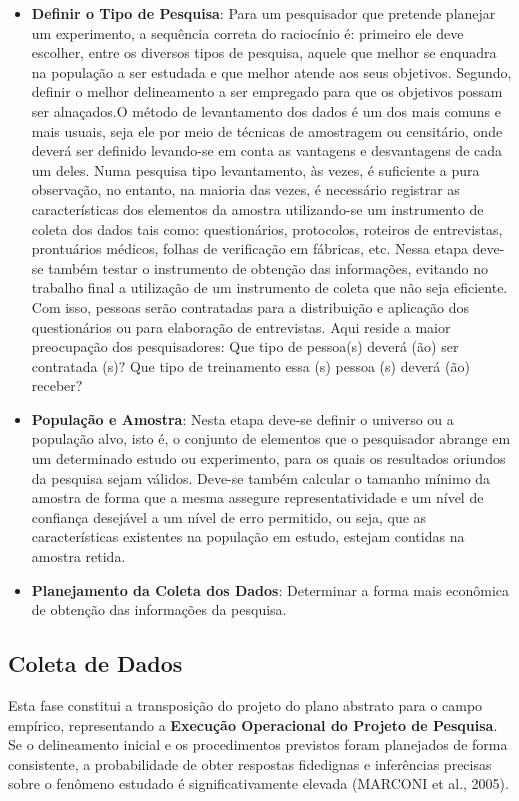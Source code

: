 \begin{itemize}
\newpage
\item \textbf{Definir o Tipo de Pesquisa}: Para um pesquisador que pretende planejar um experimento, a sequência correta do raciocínio é: primeiro ele deve escolher, entre os diversos tipos de pesquisa, aquele que melhor se enquadra na população a ser estudada e que melhor atende aos seus objetivos. Segundo, definir o melhor delineamento a ser empregado para que os objetivos possam ser alnaçados.O método de levantamento dos dados é um dos mais comuns e mais usuais, seja ele por meio de técnicas de amostragem ou censitário, onde deverá ser definido levando-se em conta as vantagens e desvantagens de cada um deles. Numa pesquisa tipo levantamento, às vezes, é suficiente a pura observação, no entanto, na maioria das vezes, é necessário registrar as características dos elementos da amostra utilizando-se um instrumento de coleta dos dados tais como: questionários, protocolos, roteiros de entrevistas, prontuários médicos, folhas de verificação em fábricas, etc. Nessa etapa deve-se também testar o instrumento de obtenção das informações, evitando no trabalho final a utilização de um instrumento de coleta que não seja eficiente. Com isso, pessoas serão contratadas para a distribuição e aplicação dos questionários ou para elaboração de entrevistas. Aqui reside a maior preocupação dos pesquisadores: Que tipo de pessoa(s) deverá (ão) ser contratada (s)$?$ Que tipo de treinamento essa (s) pessoa (s) deverá (ão) receber$?$
   \item \textbf{População e Amostra}: Nesta etapa deve-se definir o universo ou a população alvo, isto é, o conjunto de elementos que o pesquisador abrange em um determinado estudo ou experimento, para os quais os resultados oriundos da pesquisa sejam válidos. Deve-se também calcular o tamanho mínimo da amostra de forma que a mesma assegure representatividade e um nível de confiança desejável a um nível de erro permitido, ou seja, que as características existentes na população em estudo, estejam contidas na amostra retida.
   \item \textbf{Planejamento da Coleta dos Dados}: Determinar a forma mais e\-co\-nô\-mi\-ca de obtenção das informações da pesquisa.
 \end{itemize}


\subsection{Coleta de Dados}

Esta fase constitui a transposição do projeto do plano abstrato para o campo empírico, representando a \textbf{Execução Operacional do Projeto de Pesquisa}. Se o delineamento inicial e os procedimentos previstos foram planejados de forma consistente, a probabilidade de obter respostas fidedignas e inferências precisas sobre o fenômeno estudado é significativamente elevada (MARCONI et al., 2005).



